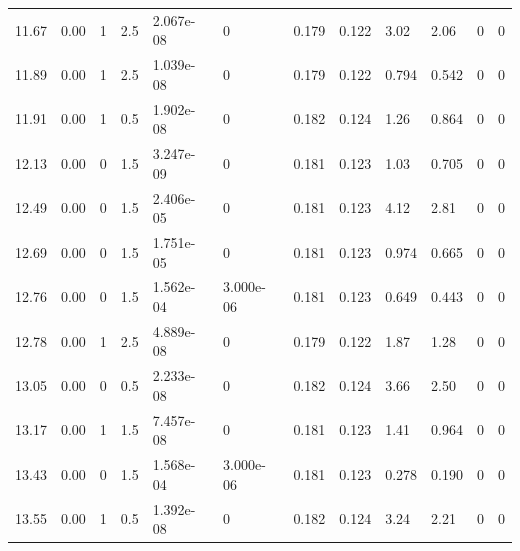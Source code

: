 \documentclass[preview]{standalone}
\begin{document}
{{{\begin{tabular}{L{1.2cm}C{1.2cm} C{0.3cm}C{0.5cm} C{1.4cm}C{1.4cm} C{1.4cm}C{1.4cm} C{1.6cm}C{1.6cm} C{1.6cm}C{1.6cm}}
  11.67  &  0.00  & 1     & 2.5 &  2.067e-08  & 0  &  0.179&   0.122& 3.02 & 2.06   &  0 & 0  \\ 
  11.89  &  0.00  & 1     & 2.5 &  1.039e-08  & 0  &  0.179&   0.122& 0.794 & 0.542   &  0 & 0  \\ 
  11.91  &  0.00  & 1     & 0.5 &  1.902e-08  & 0  &  0.182&   0.124& 1.26 & 0.864   &  0 & 0  \\ 
  12.13  &  0.00  & 0     & 1.5 &  3.247e-09  & 0  &  0.181&   0.123& 1.03 & 0.705   &  0 & 0  \\ 
  12.49  &  0.00  & 0     & 1.5 &  2.406e-05  & 0  &  0.181&   0.123& 4.12 & 2.81   &  0 & 0  \\ 
  12.69  &  0.00  & 0     & 1.5 &  1.751e-05  & 0  &  0.181&   0.123& 0.974 & 0.665   &  0 & 0  \\ 
  12.76  &  0.00  & 0     & 1.5 &  1.562e-04  & 3.000e-06  &  0.181&   0.123& 0.649 & 0.443   &  0 & 0  \\ 
  12.78  &  0.00  & 1     & 2.5 &  4.889e-08  & 0  &  0.179&   0.122& 1.87 & 1.28   &  0 & 0  \\ 
  13.05  &  0.00  & 0     & 0.5 &  2.233e-08  & 0  &  0.182&   0.124& 3.66 & 2.50   &  0 & 0  \\ 
  13.17  &  0.00  & 1     & 1.5 &  7.457e-08  & 0  &  0.181&   0.123& 1.41 & 0.964   &  0 & 0  \\ 
  13.43  &  0.00  & 0     & 1.5 &  1.568e-04  & 3.000e-06  &  0.181&   0.123& 0.278 & 0.190   &  0 & 0  \\ 
  13.55  &  0.00  & 1     & 0.5 &  1.392e-08  & 0  &  0.182&   0.124& 3.24 & 2.21   &  0 & 0  \\ 
\hline 
\end{tabular} 

}}}
\end{document}
